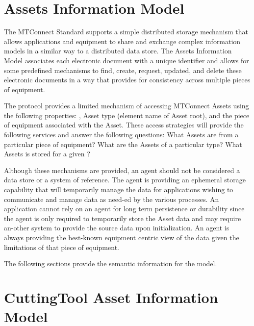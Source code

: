 
\section{Assets Information Model}
\label{sec:Assets Information Model}

The MTConnect Standard supports a simple distributed storage mechanism that allows applications and equipment to share and exchange complex information models in a similar way to a distributed data store.  The \gls{Assets Information Model} associates each electronic  document with a unique identifier and allows for some predefined mechanisms to find, create, request, updated, and delete these electronic documents in a way that provides for consistency across multiple pieces of equipment.

The protocol provides a limited mechanism of accessing \glspl{MTConnect Asset} using the following properties: , \gls{Asset} type (element name of \gls{Asset} root), and the piece of equipment associated with the \gls{Asset}.  These access strategies will provide the following services and answer the following questions: What \glspl{Asset} are from a particular piece of equipment?  What are the \glspl{Asset} of a particular type? What \glspl{Asset} is stored for a given ?

Although these mechanisms are provided, an \gls{agent} should not be considered a data store or a system of reference.  The \gls{agent} is providing an ephemeral storage capability that will temporarily manage the data for applications wishing to communicate and manage data as need-ed by the various processes.  An application cannot rely on an \gls{agent} for long term persistence or durability since the \gls{agent} is only required to temporarily store the \gls{Asset} data and may require an-other system to provide the source data upon initialization.  An \gls{agent} is always providing the best-known equipment centric view of the data given the limitations of that piece of equipment.

The following sections provide the semantic information for the  model.



\section{CuttingTool Asset Information Model}
\label{sec:CuttingTool Asset Information Model}

